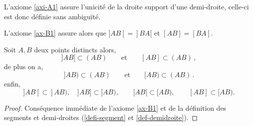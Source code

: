 \begin{rema}
    L'axiome \ref{axi-A1} assure l'unicité de la droite support d'une demi-droite, celle-ci est donc définie sans ambiguïté.
\end{rema}
\begin{rema}
    L'axiome \ref{ax-B1} assure alors que $]AB[=]BA[$ et $[AB]=[BA]$. 
\end{rema}
\begin{prop}\label{prop-inclusionsegmentdemidroite}
Soit $A,B$ deux points distincts alors,
\begin{equation*}
    ]AB[\subset (AB) \qquad \text{et} \qquad [AB]\subset (AB)\,,
\end{equation*}
de plus on a,
\begin{equation*}
   ]AB)  \subset (AB) \qquad \text{et} \qquad [AB)  \subset (AB)\,.
\end{equation*}
enfin,
\begin{equation*}
    ]AB[ \subset ]AB), \quad ]AB] \subset ]AB), \qquad [AB[ \subset [AB), \qquad [AB] \subset [AB).
\end{equation*}
\begin{proof}
    Conséquence immédiate de l'axiome \ref{ax-B1} et de la définition des segments et demi-droites (\ref{defi-segment} et \ref{def-demidroite}).
\end{proof}
\end{prop}
